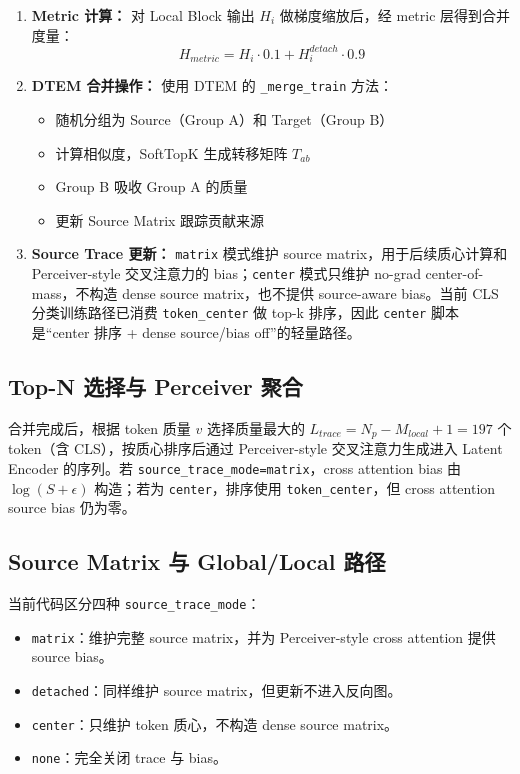 \documentclass[a4paper,11pt]{article}
\begin{document}
\begin{enumerate}
    \item \textbf{Metric 计算：} 对 Local Block 输出 $H_i$ 做梯度缩放后，经 metric 层得到合并度量：
    \[
        H_{metric} = H_i \cdot 0.1 + H_i^{detach} \cdot 0.9
    \]
    
    \item \textbf{DTEM 合并操作：} 使用 DTEM 的 \texttt{\_merge\_train} 方法：
    \begin{itemize}
        \item 随机分组为 Source（Group A）和 Target（Group B）
        \item 计算相似度，SoftTopK 生成转移矩阵 $T_{ab}$
        \item Group B 吸收 Group A 的质量
        \item 更新 Source Matrix 跟踪贡献来源
    \end{itemize}
    
    \item \textbf{Source Trace 更新：} \texttt{matrix} 模式维护 source matrix，用于后续质心计算和 Perceiver-style 交叉注意力的 bias；\texttt{center} 模式只维护 no-grad center-of-mass，不构造 dense source matrix，也不提供 source-aware bias。当前 CLS 分类训练路径已消费 \texttt{token\_center} 做 top-k 排序，因此 \texttt{center} 脚本是“center 排序 + dense source/bias off”的轻量路径。
\end{enumerate}

\subsection{Top-N 选择与 Perceiver 聚合}

合并完成后，根据 token 质量 $v$ 选择质量最大的 $L_{trace} = N_p - M_{local} + 1 = 197$ 个 token（含 CLS），按质心排序后通过 Perceiver-style 交叉注意力生成进入 Latent Encoder 的序列。若 \texttt{source\_trace\_mode=matrix}，cross attention bias 由 $\log(S+\epsilon)$ 构造；若为 \texttt{center}，排序使用 \texttt{token\_center}，但 cross attention source bias 仍为零。

\subsection{Source Matrix 与 Global/Local 路径}

当前代码区分四种 \texttt{source\_trace\_mode}：
\begin{itemize}
    \item \texttt{matrix}：维护完整 source matrix，并为 Perceiver-style cross attention 提供 source bias。
    \item \texttt{detached}：同样维护 source matrix，但更新不进入反向图。
    \item \texttt{center}：只维护 token 质心，不构造 dense source matrix。
    \item \texttt{none}：完全关闭 trace 与 bias。
\end{itemize}
\end{document}
